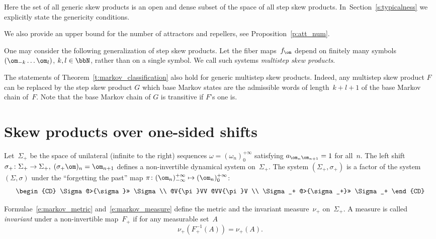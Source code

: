 \documentclass[a4paper,12pt]{amsart}
\begin{document}
Here the set of all generic skew products is an open and dense subset of the space of all step skew products.
In~Section~\ref{s:typicalness} we explicitly state the genericity conditions.

We also provide an upper bound for the number of attractors and repellers, see Proposition~\ref{p:att_num}.

\begin{Rem} \label{r:finite_step}
One may consider the following generalization of step skew products. Let the fiber maps~$f_{\om}$ depend on finitely many symbols~$(\om_{-k} \ldots \om_{l})$, $k,l \in \bbN$, rather than on a single symbol. We call such systems \emph{multistep skew products}.

The statements of Theorem~\ref{t:markov_classification} also hold for generic multistep skew products. Indeed,
any multistep skew product $F$ can be replaced by the step skew product $G$ which base Markov states are the admissible words of length~$k+l+1$ of the base Markov chain of~$F$.
Note that the base Markov chain of $G$ is transitive if $F$'s one is.
\end{Rem}



\section{Skew products over one-sided shifts}   \label{s:one-sided}


Let~$\Sigma_+$ be the space of unilateral (infinite to the right) sequences $\omega=(\omega_n)_{0}^{+\infty}$ satisfying $a_{\om_n\om_{n+1}}=1$ for all~$n$. The left shift $\sigma_+ \colon \Sigma_+\to\Sigma_+, \;(\sigma_+ \om)_n=\om_{n+1}$ defines a non-invertible dynamical system on~$\Sigma_+$. The system $(\Sigma_+,\sigma_+)$ is a factor of the system~$(\Sigma,\sigma)$ under the ``forgetting the past'' map $\pi \colon (\om_n)_{-\infty}^{+\infty}\mapsto (\om_n)_{0}^{+\infty}$:
\begin{equation}\label{e:factor}
\begin{CD}
\Sigma @>{\sigma}>> \Sigma \\
@V{\pi}VV            @VV{\pi}V \\
\Sigma_+ @>{\sigma_+}>> \Sigma_+
\end{CD}
\end{equation}

Formulae~\eqref{e:markov_metric} and~\eqref{e:markov_measure} define the metric and the invariant measure~$\nu_+$ on~$\Sigma_+$. A measure is called \emph{invariant} under a non-invertible map~$F_+$ if for any measurable set~$A$
$$
\nu_+ (F_+^{-1} (A)) = \nu_+ (A).
$$
\end{document}
